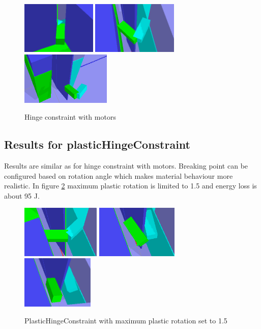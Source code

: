 \begin{figure}[htb!]
\centering
\includegraphics[height=2.5cm]{figs/f5-18-01-1}
\includegraphics[height=2.5cm]{figs/f5-18-01-2}
\includegraphics[height=2.5cm]{figs/f5-18-01-3}
\caption{Hinge constraint with motors}
\label{fig:f5-results}
\end{figure}


\subsection{Results for plasticHingeConstraint}
Results are similar as for hinge constraint with motors. 
Breaking point can be configured based on rotation angle which makes material behaviour more realistic.
In figure \ref{fig:f6-results} maximum plastic rotation is limited to 1.5 and energy loss is about 95 J.

\begin{figure}[htb!]
\centering
\includegraphics[height=2.5cm]{figs/f6-18-01-1}
\includegraphics[height=2.5cm]{figs/f6-18-01-2}
\includegraphics[height=2.5cm]{figs/f6-18-01-3}
\caption{PlasticHingeConstraint with maximum plastic rotation set to 1.5}
\label{fig:f6-results}
\end{figure}



